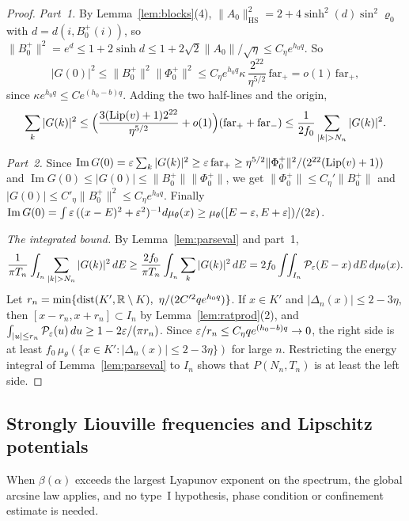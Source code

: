 \begin{proof}
\emph{Part~1.} By Lemma~\ref{lem:blocks}(4), $\|A_0\|_{\mathrm{HS}}^2=2+4\sinh^2(d)\sin^2\varrho_0$ with $d=d(i,B^+_0(i))$, so $\|B^+_0\|^2=e^d\le1+2\sinh d\le1+2\sqrt2\|A_0\|/\sqrt\eta\le C_\eta e^{h_0q}$. So
\[
|G(0)|^2\le\|B^+_0\|^2\|\Phi^+_0\|^2\le C_\eta e^{h_0q}\kappa\,\frac{2^{22}}{\eta^{5/2}}\,\mathrm{far}_+=o(1)\,\mathrm{far}_+,
\]
since $\kappa e^{h_0q}\le Ce^{(h_0-b)q}$. Adding the two half-lines and the origin,
\[
\sum_k|G(k)|^2\le\Bigl(\frac{3(\Lip(v)+1)2^{22}}{\eta^{5/2}}+o(1)\Bigr)(\mathrm{far}_++\mathrm{far}_-)\le\frac{1}{2f_0}\sum_{|k|>N_n}|G(k)|^2 .
\]

\emph{Part~2.} Since $\operatorname{Im}G(0)=\varepsilon\sum_k|G(k)|^2\ge\varepsilon\,\mathrm{far}_+\ge\eta^{5/2}\|\Phi^+_0\|^2/(2^{22}(\operatorname{Lip}(v)+1))$ and $\operatorname{Im}G(0)\le|G(0)|\le\|B^+_0\|\|\Phi^+_0\|$, we get $\|\Phi^+_0\|\le C_\eta'\|B^+_0\|$ and $|G(0)|\le C'_\eta\|B^+_0\|^2\le C_\eta e^{h_0q}$. Finally $\operatorname{Im}G(0)=\int\varepsilon\,((x-E)^2+\varepsilon^2)^{-1}d\mu_\theta(x)\ge\mu_\theta([E-\varepsilon,E+\varepsilon])/(2\varepsilon)$.

\emph{The integrated bound.} By Lemma~\ref{lem:parseval} and part~1,
\[
\frac1{\pi T_n}\int_{I_n}\sum_{|k|>N_n}|G(k)|^2\,dE\ge\frac{2f_0}{\pi T_n}\int_{I_n}\sum_k|G(k)|^2\,dE=2f_0\int\!\!\int_{I_n}\mathcal P_\eps(E-x)\,dE\,d\mu_\theta(x).
\]
Let $r_n=\min\{\dist(K',\R\setminus K),\ \eta/(2C'^2qe^{h_0q})\}$. If $x\in K'$ and $|\Delta_n(x)|\le2-3\eta$, then $[x-r_n,x+r_n]\subset I_n$ by Lemma~\ref{lem:ratprod}(2), and $\int_{|u|\le r_n}\mathcal P_\varepsilon(u)\,du\ge1-2\varepsilon/(\pi r_n)$. Since $\varepsilon/r_n\le C_\eta qe^{(h_0-b)q}\to0$, the right side is at least $f_0\,\mu_\theta(\{x\in K':|\Delta_n(x)|\le2-3\eta\})$ for large $n$. Restricting the energy integral of Lemma~\ref{lem:parseval} to $I_n$ shows that $P(N_n,T_n)$ is at least the left side.
\end{proof}

\subsection{Strongly Liouville frequencies and Lipschitz potentials}\label{sec:U1}

When $\beta(\alpha)$ exceeds the largest Lyapunov exponent on the spectrum, the global arcsine law applies, and no type~I hypothesis, phase condition or confinement estimate is needed.

